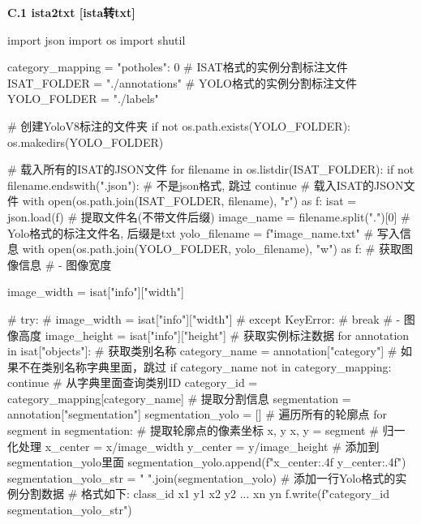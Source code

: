 \documentclass{MathorCupmodeling}
\begin{document}
\newpage

\textbf{C.1 ista2txt [ista转txt]}
\begin{python}
import json
import os
import shutil

category_mapping = {"potholes": 0}
# ISAT格式的实例分割标注文件
ISAT_FOLDER = "./annotations"
# YOLO格式的实例分割标注文件
YOLO_FOLDER = "./labels"

# 创建YoloV8标注的文件夹
if not os.path.exists(YOLO_FOLDER):
    os.makedirs(YOLO_FOLDER)


# 载入所有的ISAT的JSON文件
for filename in os.listdir(ISAT_FOLDER):
    if not filename.endswith(".json"):
        # 不是json格式, 跳过
        continue
    # 载入ISAT的JSON文件
    with open(os.path.join(ISAT_FOLDER, filename), "r") as f:
        isat = json.load(f)
    # 提取文件名(不带文件后缀)
    image_name = filename.split(".")[0]
    # Yolo格式的标注文件名, 后缀是txt
    yolo_filename = f"{image_name}.txt"
    # 写入信息
    with open(os.path.join(YOLO_FOLDER, yolo_filename), "w") as f:
        # 获取图像信息
        # - 图像宽度

        image_width = isat["info"]["width"]

        # try:
        #     image_width = isat["info"]["width"]
        # except KeyError:
        #     break
        # - 图像高度
        image_height = isat["info"]["height"]
        # 获取实例标注数据
        for annotation in isat["objects"]:
            # 获取类别名称
            category_name = annotation["category"]
            # 如果不在类别名称字典里面，跳过
            if category_name not in category_mapping:
                continue
            # 从字典里面查询类别ID
            category_id = category_mapping[category_name]
            # 提取分割信息
            segmentation = annotation["segmentation"]
            segmentation_yolo = []
            # 遍历所有的轮廓点
            for segment in segmentation:
                # 提取轮廓点的像素坐标 x, y
                x, y = segment
                # 归一化处理
                x_center = x/image_width
                y_center = y/image_height
                # 添加到segmentation_yolo里面
                segmentation_yolo.append(f"{x_center:.4f} {y_center:.4f}")
            segmentation_yolo_str = " ".join(segmentation_yolo)
            # 添加一行Yolo格式的实例分割数据
            # 格式如下: class_id x1 y1 x2 y2 ... xn yn\n
            f.write(f"{category_id} {segmentation_yolo_str}\n")
\end{python}
\end{document}
